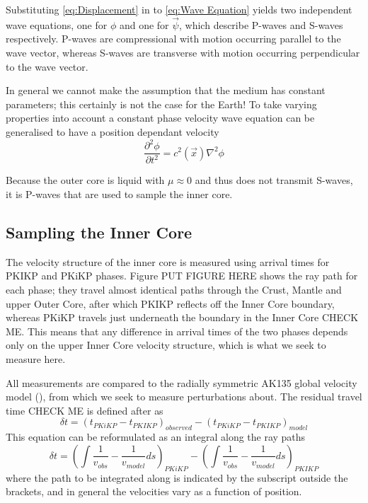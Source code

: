 \documentclass[11pt,a4paper]{article}
\begin{document}
Substituting \eqref{eq:Displacement} in to \eqref{eq:Wave Equation} yields two independent wave equations, one for $\phi$ and one for $\vec{\psi}$, which describe P-waves and S-waves respectively. P-waves are compressional with motion occurring parallel to the wave vector, whereas S-waves are transverse with motion occurring perpendicular to the wave vector.

In general we cannot make the assumption that the medium has constant parameters; this certainly is not the case for the Earth! To take varying properties into account a constant phase velocity wave equation can be generalised to have a position dependant velocity
\begin{equation}
	\frac{\partial^{2} \phi}{\partial t^{2}} = c^{2} \left ( \vec{x} \right ) \nabla^{2} \phi
\end{equation}

Because the outer core is liquid with $\mu \approx 0$ and thus does not transmit S-waves, it is P-waves that are used to sample the inner core.

\subsection{Sampling the Inner Core}
The velocity structure of the inner core is measured using arrival times for PKIKP and PKiKP phases. Figure PUT FIGURE HERE shows the ray path for each phase; they travel almost identical paths through the Crust, Mantle and upper Outer Core, after which PKIKP reflects off the Inner Core boundary, whereas PKiKP travels just underneath the boundary in the Inner Core CHECK ME. This means that any difference in arrival times of the two phases depends only on the upper Inner Core velocity structure, which is what we seek to measure here.

All measurements are compared to the radially symmetric AK135 global velocity model (\cite{Kennett1995b}), from which we seek to measure perturbations about. The residual travel time CHECK ME is defined after \cite{Waszek2011a} as
\begin{equation}
	\delta t = \left ( t_{PKiKP} - t_{PKIKP} \right )_{observed} -  \left ( t_{PKiKP} - t_{PKIKP} \right )_{model}
\end{equation}
This equation can be reformulated as an integral along the ray paths
\begin{equation}
		\delta t = \left (  \int \frac{1}{v_{obs}} - \frac{1}{v_{model}} ds  \right )_{PKiKP} - \left (  \int \frac{1}{v_{obs}} - \frac{1}{v_{model}} ds \right )_{PKIKP}
		\label{eq:deltat}
\end{equation}
where the path to be integrated along is indicated by the subscript outside the brackets, and in general the velocities vary as a function of position.
\end{document}
